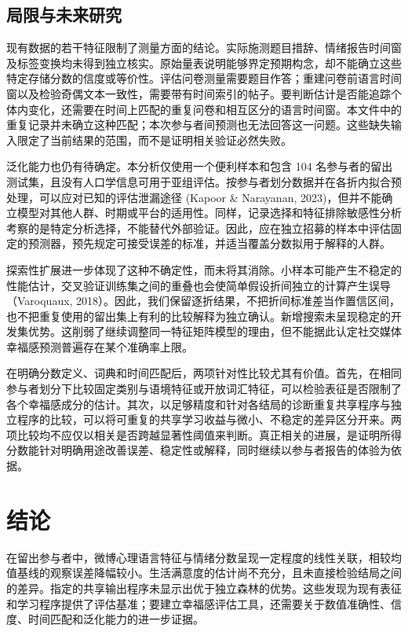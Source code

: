 \documentclass[11pt,letterpaper]{article}
\begin{document}
\subsection{局限与未来研究}\label{ux5c40ux9650ux4e0eux672aux6765ux7814ux7a76}

现有数据的若干特征限制了测量方面的结论。实际施测题目措辞、情绪报告时间窗及标签变换均未得到独立核实。原始量表说明能够界定预期构念，却不能确立这些特定存储分数的信度或等价性。评估问卷测量需要题目作答；重建问卷前语言时间窗以及检验奇偶文本一致性，需要带有时间索引的帖子。要判断估计是否能追踪个体内变化，还需要在时间上匹配的重复问卷和相互区分的语言时间窗。本文件中的重复记录并未确立这种匹配；本次参与者间预测也无法回答这一问题。这些缺失输入限定了当前结果的范围，而不是证明相关验证必然失败。

泛化能力也仍有待确定。本分析仅使用一个便利样本和包含 104 名参与者的留出测试集，且没有人口学信息可用于亚组评估。按参与者划分数据并在各折内拟合预处理，可以应对已知的评估泄漏途径 (Kapoor \& Narayanan, 2023)，但并不能确立模型对其他人群、时期或平台的适用性。同样，记录选择和特征排除敏感性分析考察的是特定分析选择，不能替代外部验证。因此，应在独立招募的样本中评估固定的预测器，预先规定可接受误差的标准，并适当覆盖分数拟用于解释的人群。

探索性扩展进一步体现了这种不确定性，而未将其消除。小样本可能产生不稳定的性能估计，交叉验证训练集之间的重叠也会使简单假设折间独立的计算产生误导（Varoquaux, 2018）。因此，我们保留逐折结果，不把折间标准差当作置信区间，也不把重复使用的留出集上有利的比较解释为独立确认。新增搜索未呈现稳定的开发集优势。这削弱了继续调整同一特征矩阵模型的理由，但不能据此认定社交媒体幸福感预测普遍存在某个准确率上限。

在明确分数定义、词典和时间匹配后，两项针对性比较尤其有价值。首先，在相同参与者划分下比较固定类别与语境特征或开放词汇特征，可以检验表征是否限制了各个幸福感成分的估计。其次，以足够精度和针对各结局的诊断重复共享程序与独立程序的比较，可以将可重复的共享学习收益与微小、不稳定的差异区分开来。两项比较均不应仅以相关是否跨越显著性阈值来判断。真正相关的进展，是证明所得分数能针对明确用途改善误差、稳定性或解释，同时继续以参与者报告的体验为依据。

\section{结论}\label{ux7ed3ux8bba}

在留出参与者中，微博心理语言特征与情绪分数呈现一定程度的线性关联，相较均值基线的观察误差降幅较小。生活满意度的估计尚不充分，且未直接检验结局之间的差异。指定的共享输出程序未显示出优于独立森林的优势。这些发现为现有表征和学习程序提供了评估基准；要建立幸福感评估工具，还需要关于数值准确性、信度、时间匹配和泛化能力的进一步证据。
\end{document}
